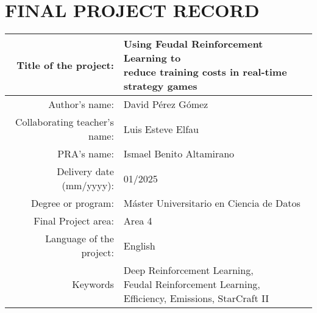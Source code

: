 \chapter*{FINAL PROJECT RECORD}

\begin{table}[ht]
\centering{}
\renewcommand{\arraystretch}{2}
\begin{tabular}{r | l}
\hline
Title of the project: & \makecell[cl]{Using Feudal Reinforcement Learning to\\reduce training costs in real-time strategy games}\\
\hline
Author's name: & David Pérez Gómez\\
\hline
Collaborating teacher's name: & Luis Esteve Elfau\\
\hline
PRA's name: & Ismael Benito Altamirano\\
\hline
Delivery date (mm/yyyy): & 01/2025\\
\hline
Degree or program: & Máster Universitario en Ciencia de Datos\\
\hline
Final Project area: & Area 4\\
\hline
Language of the project: & English\\
\hline
Keywords & \makecell[cl]{Deep Reinforcement Learning,\\ Feudal Reinforcement Learning,\\ Efficiency, Emissions, StarCraft II\\}\\
\hline
\end{tabular}
\end{table}
